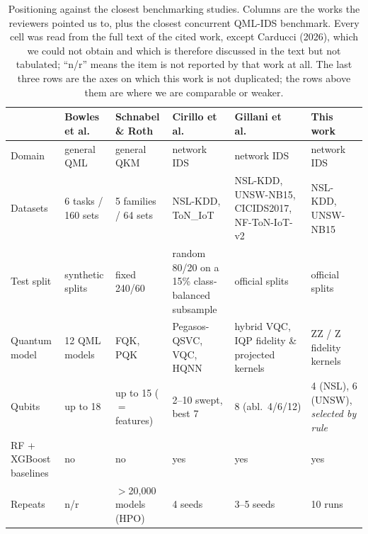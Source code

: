 \begin{table}[t]
\centering
\caption{Positioning against the closest benchmarking studies. Columns are the
works the reviewers pointed us to, plus the closest concurrent QML-IDS
benchmark. Every cell was read from the full text of the cited work, except
Carducci (2026), which we could not obtain and which is therefore discussed in
the text but not tabulated; ``n/r'' means the item is not reported by that work
at all. The last three rows are the axes on which this work is not duplicated;
the rows above them are where we are comparable or weaker.}
\label{tab:novelty}
\footnotesize
\setlength{\tabcolsep}{4pt}
\begin{tabular}{@{}l p{2.05cm} p{2.05cm} p{2.05cm} p{2.35cm} p{2.6cm}@{}}
\toprule
 & \textbf{Bowles et al.\ \cite{bowles2024}} & \textbf{Schnabel \& Roth \cite{schnabel2024}} & \textbf{Cirillo et al.\ \cite{qmi2026}} & \textbf{Gillani et al.\ \cite{gillani2026}} & \textbf{This work} \\
\midrule
Domain          & general QML        & general QKM        & network IDS        & network IDS        & network IDS \\
Datasets        & 6 tasks / 160 sets & 5 families / 64 sets & NSL-KDD, ToN\_IoT & NSL-KDD, UNSW-NB15, CICIDS2017, NF-ToN-IoT-v2 & NSL-KDD, UNSW-NB15 \\
Test split      & synthetic splits   & fixed 240/60       & random 80/20 on a 15\% class-balanced subsample & official splits    & official splits \\
Quantum model   & 12 QML models      & FQK, PQK           & Pegasos-QSVC, VQC, HQNN & hybrid VQC, IQP fidelity \& projected kernels & ZZ / Z fidelity kernels \\
Qubits          & up to 18           & up to 15 ($=$ features) & 2--10 swept, best 7 & 8 (abl.\ 4/6/12)   & 4 (NSL), 6 (UNSW), \emph{selected by rule} \\
RF + XGBoost baselines & no          & no                 & yes                & yes                & yes \\
Repeats         & n/r                & $>$20{,}000 models (HPO) & 4 seeds      & 3--5 seeds         & 10 runs \\

\end{tabular}
\end{table}
